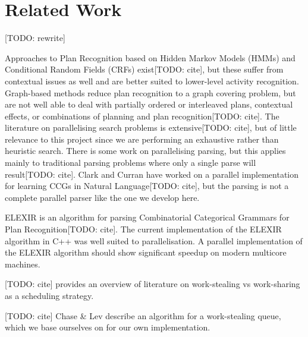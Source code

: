 \chapter{Related Work}

[TODO: rewrite]

Approaches to Plan Recognition based on Hidden Markov Models (HMMs) and Conditional Random Fields (CRFs) exist[TODO: cite], but these suffer from contextual issues as well and are better suited to lower-level activity recognition. Graph-based methods reduce plan recognition to a graph covering problem, but are not well able to deal with partially ordered or interleaved plans, contextual effects, or combinations of planning and plan recognition[TODO: cite].
The literature on parallelising search problems is extensive[TODO: cite], but of little relevance to this project since we are performing an exhaustive rather than heuristic search. There is some work on parallelising parsing, but this applies mainly to traditional parsing problems where only a single parse will result[TODO: cite].
Clark and Curran have worked on a parallel implementation for learning CCGs in Natural Language[TODO: cite], but the parsing is not a complete parallel parser like the one we develop here.

ELEXIR is an algorithm for parsing Combinatorial Categorical Grammars for Plan Recognition[TODO: cite]. The current implementation of the ELEXIR algorithm in C++ was well suited to parallelisation. A parallel implementation of the ELEXIR algorithm should show significant speedup on modern multicore machines.

[TODO: cite] provides an overview of literature on work-stealing vs work-sharing as a scheduling strategy. 

[TODO: cite] Chase \& Lev describe an algorithm for a work-stealing queue, which we base ourselves on for our own implementation.

\begin{comment}
[1] Goldman, R. P.; Geib, C. W.; and Miller, C. A. 1999.
plan recognition. In
Intelligence.
A new model of
Proceedings of the Conference on Uncertainty in Artificial
[2] Geib, C. W. 2009.
Delaying Commitment in Plan Recognition Using
Proceedings of the International Joint
Conference on Artificial Intelligence (IJCAI) 2009, 1702-1707.
Combinatory Categorial Grammars. In
[3] Blumofe, R.D.; Leiserson, C.E. 1994. Scheduling multithreaded computa-
Foundations of Computer Science, 1994 Proceedings.,
35th Annual Symposium on, 356-368.
tions by work stealing. In
[4] Grune, D: Parsing techniques: a practical guide. Springer, 2008. ISBN
978-1-4419-1901-4.
[5] Andrews, G. R. Foundations of Multithreaded, Parallel, and Distributed
Programming. Addison-Wesley, 2000. ISBN 978-0-2013-5752-3.
[6] Clark S.; Curran, J. R. 2003. Log-linear models for wide-coverage CCG
Proceedings of the 2003 conference on Empirical methods in natural
language processing, 97-104.
parsing. In
[7] Avrahami-Zilberbrand, D., and Kaminka, G. A. 2005. Fast and complete
symbolic plan recognition. In
Proceedings IJ-CAI.
[8] Bui, H. H.; Venkatesh, S.; and West, G. 2002.
the Abstract Hidden Markov Model.
Policy recognition in
Journal of Artificial Intelligence Research
17:451-499.
\end{comment}